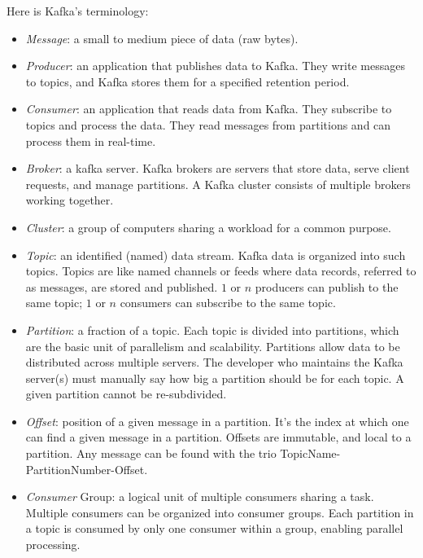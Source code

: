\documentclass{article}
\begin{document}
\begin{itemize}
	Here is Kafka's terminology:
	\begin{itemize}
		\item \textit{Message}: a small to medium piece of data (raw bytes).
		\item \textit{Producer}: an application that publishes data to Kafka. They write messages to topics, and Kafka stores them for a specified retention period.
		\item \textit{Consumer}: an application that reads data from Kafka. They subscribe to topics and process the data. They read messages from partitions and can process them in real-time.
		\item \textit{Broker}: a kafka server. Kafka brokers are servers that store data, serve client requests, and manage partitions. A Kafka cluster consists of multiple brokers working together.
		\item \textit{Cluster}: a group of computers sharing a workload for a common purpose.
		\item \textit{Topic}: an identified (named) data stream. Kafka data is organized into such topics. Topics are like named channels or feeds where data records, referred to as messages, are stored and published. $1$ or $n$ producers can publish to the same topic; $1$ or $n$ consumers can subscribe to the same topic.
		\item \textit{Partition}: a fraction of a topic. Each topic is divided into partitions, which are the basic unit of parallelism and scalability. Partitions allow data to be distributed across multiple servers. The developer who maintains the Kafka server(s) must manually say how big a partition should be for each topic. A given partition cannot be re-subdivided.
		\item \textit{Offset}: position of a given message in a partition. It's the index at which one can find a given message in a partition. Offsets are immutable, and local to a partition. Any message can be found with the trio TopicName-PartitionNumber-Offset.
		\item \textit{Consumer} Group: a logical unit of multiple consumers sharing a task. Multiple consumers can be organized into consumer groups. Each partition in a topic is consumed by only one consumer within a group, enabling parallel processing.
	\end{itemize}


\end{itemize}
\end{document}

